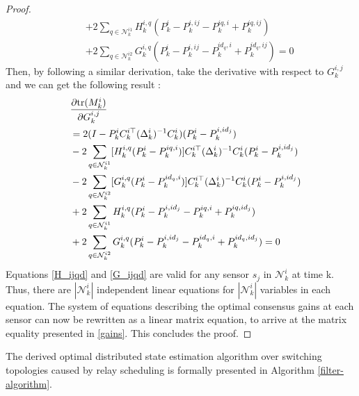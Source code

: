 \documentclass[twocolumn]{IEEEtran}
\newcommand{\tr}{{\rm tr}}
\begin{document}
\begin{proof}
\begin{equation}
\begin{split}
\quad&+2\sum_{q\in\mathcal{N}_{k}^{i1}}H_{k}^{i,q}(P_{k}^{i}-P_{k}^{i,ij}-P_{k}^{iq,i}+P_{k}^{iq,ij})\\
\quad&+2\sum_{q\in\mathcal{N}_{k}^{i2}}G_{k}^{i,q}(P_{k}^{i}-P_{k}^{i,ij}-P_{k}^{id_q,i}+P_{k}^{id_q,ij})=0
\end{split}
\end{equation}
Then, by following a similar derivation, take the derivative with respect to $G_{k}^{i,j}$ and we can get the following result :
\begin{equation}\label{G_ijqd}
\begin{split}
&\frac{\partial\tr(M_{k}^i)}{\partial G_{k}^{i,j}}\\
&=2(I-P_{k}^{i}C_{k}^{i\top}(\Delta_{k}^{i})^{-1}C_{k}^{i})(P_{k}^{i}-P_{k}^{i,id_j})\\
\quad&-2\sum_{q\in\mathcal{N}_{k}^{i1}}[H_{k}^{i,q}(P_{k}^{i}-P_{k}^{iq,i})]C_{k}^{i\top}(\Delta_{k}^{i})^{-1}C_{k}^{i}(P_{k}^{i}-P_{k}^{i,id_j})\\
\quad&-2\sum_{q\in\mathcal{N}_{k}^{i2}}[G_{k}^{i,q}(P_{k}^{i}-P_{k}^{id_q,i})]C_{k}^{i\top}(\Delta_{k}^{i})^{-1}C_{k}^{i}(P_{k}^{i}-P_{k}^{i,id_j})\\
\quad&+2\sum_{q\in\mathcal{N}_{k}^{i1}}H_{k}^{i,q}(P_{k}^{i}-P_{k}^{i,id_j}-P_{k}^{iq,i}+P_{k}^{iq,id_ j})\\
\quad&+2\sum_{q\in\mathcal{N}_{k}^{i2}}G_{k}^{i,q}(P_{k}^{i}-P_{k}^{i,id_j}-P_{k}^{id_q,i}+P_{k}^{id_q,id_j})=0
\end{split}
\end{equation}
Equations \eqref{H_ijqd} and \eqref{G_ijqd} are valid for any sensor $s_{j}$ in $\mathcal{N}_{k}^{i}$ at time k. Thus, there are $|\mathcal{N}_{k}^{i}|$ independent linear equations for $|\mathcal{N}_{k}^{i}|$ variables in each equation. The system of equations describing the optimal consensus gains at each sensor can now be rewritten as a linear matrix equation, to arrive at the matrix equality presented in \eqref{gains}. This concludes the proof.
\end{proof}
The derived optimal distributed state estimation algorithm over switching topologies caused by relay scheduling is formally presented in Algorithm \ref{filter-algorithm}.
\end{document}
